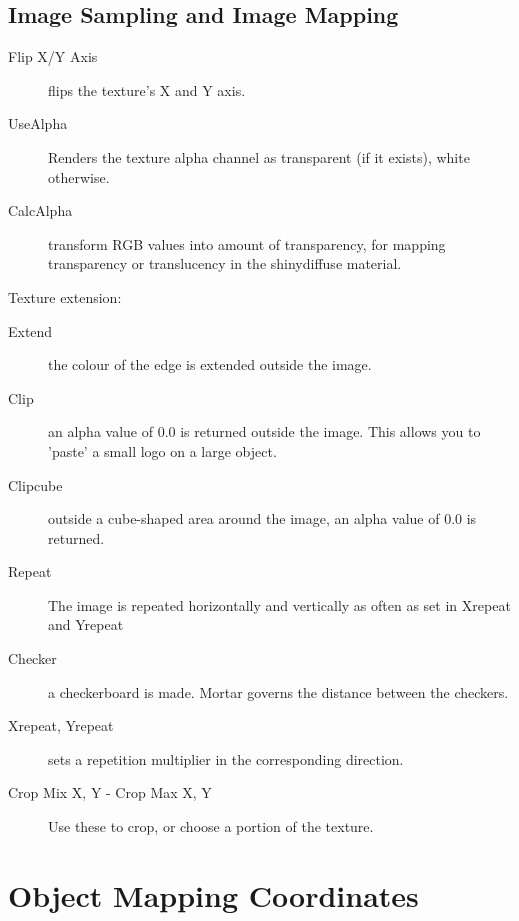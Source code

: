 \subsection{Image Sampling and Image Mapping}
\begin{description}
\item[Flip X/Y Axis] flips the texture's X and Y axis.
\item[UseAlpha] Renders the texture alpha channel as transparent (if it exists), white otherwise.
\item[CalcAlpha] transform RGB values into amount of transparency, for mapping transparency or translucency in the shinydiffuse material.
\end{description}

Texture extension:

\begin{description}
\item[Extend] the colour of the edge is extended outside the image.
\item[Clip] an alpha value of 0.0 is returned outside the image. This allows you to 'paste' a small logo on a large object.
\item[Clipcube] outside a cube-shaped area around the image, an alpha value of 0.0 is returned.
\item[Repeat] The image is repeated horizontally and vertically as often as set in Xrepeat and Yrepeat
\item[Checker] a checkerboard is made. Mortar governs the distance between the checkers.
\item[Xrepeat, Yrepeat] sets a repetition multiplier in the corresponding direction.
\item[Crop Mix X, Y - Crop Max X, Y] Use these to crop, or choose a portion of the texture.
\end{description}

\section{Object Mapping Coordinates}

